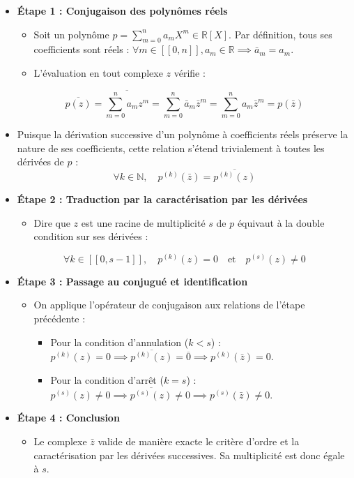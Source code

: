 \documentclass[11pt, a4paper]{article}
\theoremstyle{definition}
\begin{document}
\begin{itemize}
\item \textbf{Étape 1 : Conjugaison des polynômes réels}
\begin{itemize}
\item Soit un polynôme $p = \sum_{m=0}^n a_m X^m \in \mathbb{R}[X]$. Par définition, tous ses coefficients sont réels : $\forall m \in [\![0, n]\!], a_m \in \mathbb{R} \implies \bar{a}_m = a_m$.
\item L'évaluation en tout complexe $z$ vérifie :
\end{itemize}
\[
\overline{p(z)} = \overline{\sum_{m=0}^n a_m z^m} = \sum_{m=0}^n \bar{a}_m \bar{z}^m = \sum_{m=0}^n a_m \bar{z}^m = p(\bar{z})
\]
\item Puisque la dérivation successive d'un polynôme à coefficients réels préserve la nature de ses coefficients, cette relation s'étend trivialement à toutes les dérivées de $p$ :
\[
\forall k \in \mathbb{N}, \quad p^{(k)}(\bar{z}) = \overline{p^{(k)}(z)}
\]
\item \textbf{Étape 2 : Traduction par la caractérisation par les dérivées}
\begin{itemize}
\item Dire que $z$ est une racine de multiplicité $s$ de $p$ équivaut à la double condition sur ses dérivées :
\end{itemize}
\[
\forall k \in [\![0, s-1]\!], \quad p^{(k)}(z) = 0 \quad \text{et} \quad p^{(s)}(z) \neq 0
\]
\item \textbf{Étape 3 : Passage au conjugué et identification}
\begin{itemize}
\item On applique l'opérateur de conjugaison aux relations de l'étape précédente :
\begin{itemize}
\item Pour la condition d'annulation ($k < s$) : $p^{(k)}(z) = 0 \implies \overline{p^{(k)}(z)} = \overline{0} \implies p^{(k)}(\bar{z}) = 0$.
\item Pour la condition d'arrêt ($k = s$) : $p^{(s)}(z) \neq 0 \implies \overline{p^{(s)}(z)} \neq 0 \implies p^{(s)}(\bar{z}) \neq 0$.
\end{itemize}
\end{itemize}
\item \textbf{Étape 4 : Conclusion}
\begin{itemize}
\item Le complexe $\bar{z}$ valide de manière exacte le critère d'ordre et la caractérisation par les dérivées successives. Sa multiplicité est donc égale à $s$.
\end{itemize}
\end{itemize}
\end{document}
